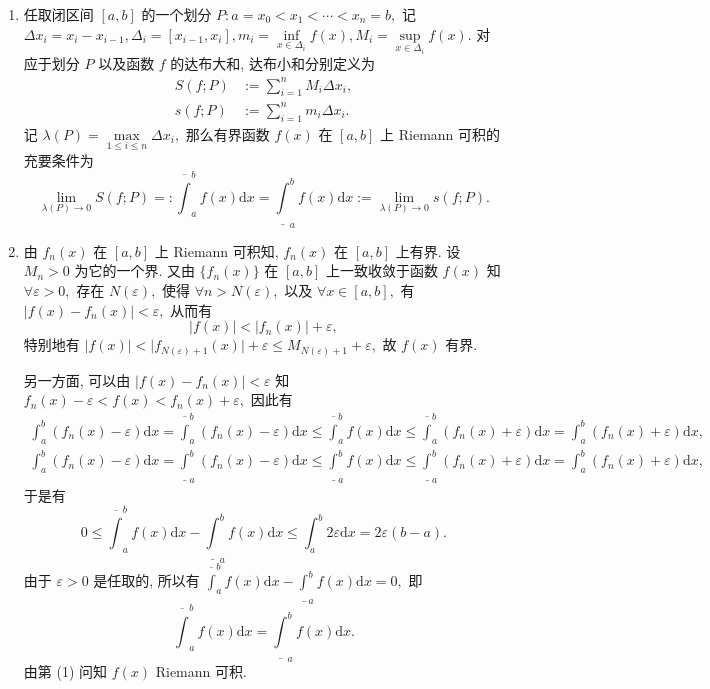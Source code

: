 \begin{solution}
  \begin{enumerate}
    \item 任取闭区间 $[a, b]$ 的一个划分 $P: a = x_0 < x_1 < \cdots < x_n = b,$ 记 $\Delta x_i = x_i - x_{i-1}, \Delta_i = [x_{i-1}, x_i], m_i = \inf\limits_{x\in \Delta_i} f(x), M_i = \sup\limits_{x\in \Delta_i} f(x).$ 对应于划分 $P$ 以及函数 $f$ 的达布大和, 达布小和分别定义为
    \begin{align*}
      S(f; P) & := \sum\limits_{i = 1}^n M_i \Delta x_i, \\
      s(f; P) & := \sum\limits_{i = 1}^n m_i \Delta x_i.
    \end{align*}
    记 $\lambda(P) = \max\limits_{1\leqslant i \leqslant n} \Delta x_i,$ 那么有界函数 $f(x)$ 在 $[a, b]$ 上 Riemann 可积的充要条件为
    $$\lim\limits_{\lambda(P) \to 0} S(f; P) =: \overline{\int}_a^b f(x) \mathrm{d} x = \underline{\int}_a^b f(x) \mathrm{d} x := \lim\limits_{\lambda(P) \to 0} s(f; P).$$
    \item 由 $f_n(x)$ 在 $[a, b]$ 上 Riemann 可积知, $f_n(x)$ 在 $[a, b]$ 上有界. 设 $M_n > 0$ 为它的一个界. 又由 $\{f_n(x)\}$ 在 $[a, b]$ 上一致收敛于函数 $f(x)$ 知 $\forall \varepsilon > 0,$ 存在 $N(\varepsilon),$ 使得 $\forall n > N(\varepsilon),$ 以及 $\forall x \in [a, b],$ 有 $\lvert f(x) - f_n(x) \rvert < \varepsilon,$ 从而有
    $$\lvert f(x) \rvert < \lvert f_n(x) \rvert + \varepsilon,$$
    特别地有 $\lvert f(x) \rvert < \lvert f_{N(\varepsilon) + 1}(x) \rvert + \varepsilon \leqslant M_{N(\varepsilon) + 1} + \varepsilon,$ 故 $f(x)$ 有界.

    另一方面, 可以由 $\lvert f(x) - f_n(x) \rvert < \varepsilon$ 知 $f_n(x) - \varepsilon < f(x) < f_n(x) +\varepsilon,$ 因此有
    \begin{gather*}
      \int_a^b (f_n(x) - \varepsilon) \mathrm{d} x = \overline{\int}_a^b (f_n(x) - \varepsilon) \mathrm{d} x \leqslant \overline{\int}_a^b f(x) \mathrm{d} x \leqslant \overline{\int}_a^b (f_n(x) + \varepsilon) \mathrm{d} x = \int_a^b (f_n(x) + \varepsilon) \mathrm{d} x, \\
      \int_a^b (f_n(x) - \varepsilon) \mathrm{d} x = \underline{\int}_a^b (f_n(x) - \varepsilon) \mathrm{d} x \leqslant \underline{\int}_a^b f(x) \mathrm{d} x \leqslant \underline{\int}_a^b (f_n(x) + \varepsilon) \mathrm{d} x = \int_a^b (f_n(x) + \varepsilon) \mathrm{d} x,
    \end{gather*}
    于是有
    $$0 \leqslant \overline{\int}_a^b f(x) \mathrm{d} x - \underline{\int}_a^b f(x) \mathrm{d} x \leqslant \int_a^b 2\varepsilon \mathrm{d} x = 2\varepsilon (b-a).$$
    由于 $\varepsilon > 0$ 是任取的, 所以有 $\overline{\int}_a^b f(x) \mathrm{d} x - \underline{\int}_a^b f(x) \mathrm{d} x = 0,$ 即
    $$\overline{\int}_a^b f(x) \mathrm{d} x = \underline{\int}_a^b f(x) \mathrm{d} x.$$
    由第 (1) 问知 $f(x)$ Riemann 可积.


\end{enumerate}
\end{solution}
